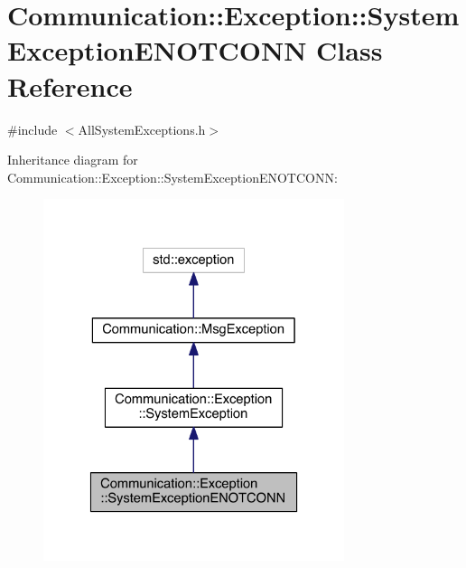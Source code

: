 \hypertarget{class_communication_1_1_exception_1_1_system_exception_e_n_o_t_c_o_n_n}{}\section{Communication\+:\+:Exception\+:\+:System\+Exception\+E\+N\+O\+T\+C\+O\+N\+N Class Reference}
\label{class_communication_1_1_exception_1_1_system_exception_e_n_o_t_c_o_n_n}


{\ttfamily \#include $<$All\+System\+Exceptions.\+h$>$}



Inheritance diagram for Communication\+:\+:Exception\+:\+:System\+Exception\+E\+N\+O\+T\+C\+O\+N\+N\+:\nopagebreak
\begin{figure}[H]
\begin{center}
\leavevmode
\includegraphics[width=250pt]{class_communication_1_1_exception_1_1_system_exception_e_n_o_t_c_o_n_n__inherit__graph}
\end{center}
\end{figure}


